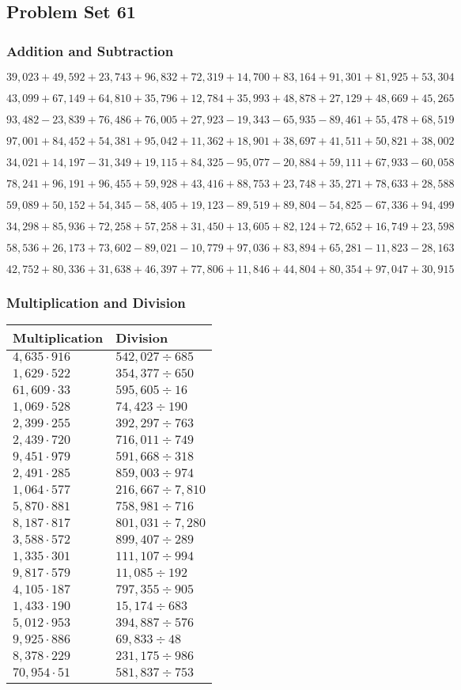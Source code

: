 \hypertarget{problem-set-61-1}{%
\subsection{Problem Set 61}\label{problem-set-61-1}}

\hypertarget{addition-and-subtraction-283}{%
\subsubsection{Addition and
Subtraction}\label{addition-and-subtraction-283}}

\(39,023+49,592+23,743+96,832+72,319+14,700+83,164+91,301+81,925+ 53,304\)

\(43,099+67,149+64,810+35,796+12,784+35,993+48,878+27,129+48,669+45,265\)

\(93,482-23,839+76,486+76,005+27,923-19,343-65,935-89,461+55,478+68,519\)

\(97,001+84,452+54,381+95,042+11,362+18,901+38,697+41,511+50,821+38,002\)

\(34,021+14,197-31,349+19,115+84,325-95,077-20,884+59,111+67,933-60,058\)

\(78,241+96,191+96,455+59,928+43,416+88,753+23,748+35,271+78,633+28,588\)

\(59,089+50,152+54,345-58,405+19,123-89,519+89,804-54,825-67,336+94,499\)

\(34,298+85,936+72,258+57,258+31,450+13,605+82,124+72,652+16,749+23,598\)

\(58,536+26,173+73,602-89,021-10,779+97,036+83,894+65,281-11,823-28,163\)

\(42,752+80,336+31,638+46,397+77,806+11,846+44,804+80,354+97,047+30,915\)

\hypertarget{multiplication-and-division-282}{%
\subsubsection{Multiplication and
Division}\label{multiplication-and-division-282}}

\begin{longtable}[]{@{}ll@{}}
\toprule
Multiplication & Division\tabularnewline
\midrule
\endhead
\(4,635\cdot916\) & \(542,027÷685\)\tabularnewline
\(1,629\cdot522\) & \(354,377÷650\)\tabularnewline
\(61,609\cdot33\) & \(595,605÷16\)\tabularnewline
\(1,069\cdot528\) & \(74,423÷190\)\tabularnewline
\(2,399\cdot255\) & \(392,297÷763\)\tabularnewline
\(2,439\cdot720\) & \(716,011÷749\)\tabularnewline
\(9,451\cdot979\) & \(591,668÷318\)\tabularnewline
\(2,491\cdot285\) & \(859,003÷974\)\tabularnewline
\(1,064\cdot577\) & \(216,667÷7,810\)\tabularnewline
\(5,870\cdot881\) & \(758,981÷716\)\tabularnewline
\(8,187\cdot817\) & \(801,031÷7,280\)\tabularnewline
\(3,588\cdot572\) & \(899,407÷289\)\tabularnewline
\(1,335\cdot301\) & \(111,107÷994\)\tabularnewline
\(9,817\cdot579\) & \(11,085÷192\)\tabularnewline
\(4,105\cdot187\) & \(797,355÷905\)\tabularnewline
\(1,433\cdot190\) & \(15,174÷683\)\tabularnewline
\(5,012\cdot953\) & \(394,887÷576\)\tabularnewline
\(9,925\cdot886\) & \(69,833÷48\)\tabularnewline
\(8,378\cdot229\) & \(231,175÷986\)\tabularnewline
\(70,954\cdot51\) & \(581,837÷753\)\tabularnewline
\bottomrule
\end{longtable}


